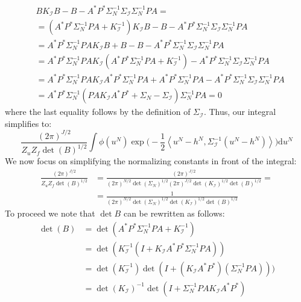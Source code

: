 \begin{align*}
    &BK_{\mathcal{I}}B-B-A^{*}P^{*}\Sigma_{N}^{-1}\Sigma_{\mathcal{I}}\Sigma_{N}^{-1}PA = \\
    &=(A^{*}P^{*}\Sigma_{N}^{-1}PA+K_{\mathcal{I}}^{-1})K_{\mathcal{I}}B-B-A^{*}P^{*}\Sigma_{N}^{-1}\Sigma_{\mathcal{I}}\Sigma_{N}^{-1}PA \\
    &=A^{*}P^{*}\Sigma_{N}^{-1}PAK_{\mathcal{I}}B+B-B-A^{*}P^{*}\Sigma_{N}^{-1}\Sigma_{\mathcal{I}}\Sigma_{N}^{-1}PA \\
    &=A^{*}P^{*}\Sigma_{N}^{-1}PAK_{\mathcal{I}}(A^{*}P^{*}\Sigma_{N}^{-1}PA+K_{\mathcal{I}}^{-1})-A^{*}P^{*}\Sigma_{N}^{-1}\Sigma_{\mathcal{I}}\Sigma_{N}^{-1}PA \\
    &=A^{*}P^{*}\Sigma_{N}^{-1}PAK_{\mathcal{I}}A^{*}P^{*}\Sigma_{N}^{-1}PA + A^{*}P^{*}\Sigma_{N}^{-1}PA - A^{*}P^{*}\Sigma_{N}^{-1}\Sigma_{\mathcal{I}}\Sigma_{N}^{-1}PA \\
    &= A^{*}P^{*}\Sigma_{N}^{-1}(PAK_{\mathcal{I}}A^{*}P^{*}+\Sigma_{N}-\Sigma_{\mathcal{I}})\Sigma_{N}^{-1}PA = 0
\end{align*}
where the last equality follows by the definition of $\Sigma_{\mathcal{I}}$. Thus, our integral simplifies to:
\begin{equation}
    \frac{(2\pi)^{J/2}}{Z_{u}Z_{f}\det(B)^{1/2}}\int\phi(u^{N})\exp\Big(-\frac{1}{2}\left\langle u^{N}-h^{N},\Sigma_{\mathcal{I}}^{-1}(u^{N}-h^{N}) \right\rangle\Big)\mathrm{d}u^{N}
\end{equation}
We now focus on simplifying the normalizing constants in front of the integral:
\begin{align*}
    \frac{(2\pi)^{J/2}}{Z_{u}Z_{f}\det(B)^{1/2}}&=\frac{(2\pi)^{J/2}}{(2\pi)^{N/2}\det(\Sigma_N)^{1/2}(2\pi)^{J/2}\det(K_\mathcal{I})^{1/2}\det(B)^{1/2}}= \\
    &=\frac{1}{(2\pi)^{N/2}\det(\Sigma_N)^{1/2}\det(K_\mathcal{I})^{1/2}\det(B)^{1/2}}
\end{align*}
To proceed we note that $\det{B}$ can be rewritten as follows:
\begin{align*}
    \det(B)&=\det(A^{*}P^{*}\Sigma_{N}^{-1}PA + K_{\mathcal{I}}^{-1}) \\
    &=\det(K_{\mathcal{I}}^{-1}(I+K_{\mathcal{I}}A^{*}P^{*}\Sigma_{N}^{-1}PA)) \\
    &=\det(K_{\mathcal{I}}^{-1})\det(I+(K_{\mathcal{I}}A^{*}P^{*})(\Sigma_{N}^{-1}PA))) \\
    &=\det(K_{\mathcal{I}})^{-1}\det(I+\Sigma_{N}^{-1}PAK_{\mathcal{I}}A^{*}P^{*})
\end{align*}
